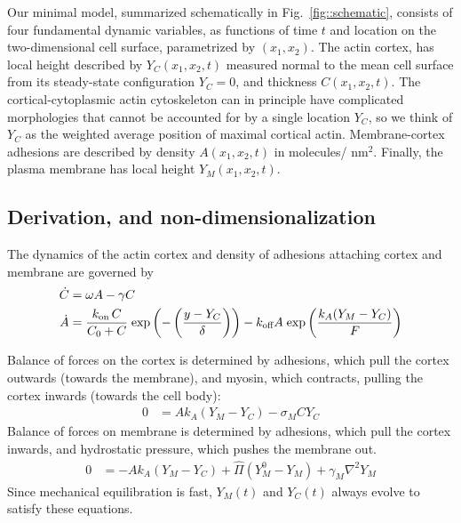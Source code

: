 

Our minimal model, summarized schematically in Fig.~\ref{fig::schematic}, consists of four fundamental dynamic variables, as functions of time $t$ and location on the two-dimensional cell surface, parametrized by $(x_1, x_2)$. The actin cortex, has local height described by $Y_C(x_1,x_2,t)$ measured normal to the mean cell surface from its steady-state configuration $Y_C=0$, and thickness $C(x_1,x_2,t)$. The cortical-cytoplasmic actin cytoskeleton can in principle have complicated morphologies that cannot be accounted for by a single location $Y_C$, so we think of $Y_C$ as the weighted average position of maximal cortical actin. Membrane-cortex adhesions are described by density $A(x_1,x_2,t)$ in molecules/ $\text{nm}^2$. Finally, the plasma membrane has local height $Y_M(x_1,x_2,t)$.

\subsection{Derivation, and non-dimensionalization}
The dynamics of the actin cortex and  density of adhesions attaching cortex and membrane are governed by
\begin{align}
\dot{C} &= \omega A - \gamma C \label{eq::CDotequation}\\
\dot{A} &=  \frac{\kon\,C}{C_0+C}\; \mbox{exp}\left( - \left(\frac{y-Y_C}{\delta}\right)\right) - \koff A\; \mbox{exp}\left( \frac{k_A (Y_M-Y_C)}{F}\right)\label{eq::ADotequation}
\end{align}

Balance of forces on the cortex is determined by adhesions, which pull the cortex outwards (towards the membrane), and myosin, which contracts, pulling the cortex inwards (towards the cell body):
\begin{align}
0 &= A k_A (Y_M-Y_C) - \sigma_M C Y_C \label{eq::forceBalanceCortex}
\end{align}
Balance of forces on membrane is determined by adhesions, which pull the cortex inwards, and hydrostatic pressure, which pushes the membrane out. 
\begin{align}
0 &= - Ak_A (Y_M-Y_C) + \hat{\Pi}(Y_M^0 - Y_M) + \gamma_M \nabla^2  Y_M \label{eq::forceBalanceMembrane}
\end{align}
Since mechanical equilibration is fast, $Y_M(t)$ and $Y_C(t)$ always evolve to satisfy these equations.


